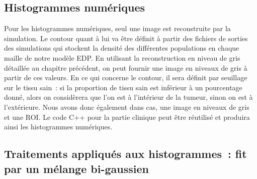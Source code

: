 \documentclass[main.tex]{subfiles}
\begin{document}
\subsection{Histogrammes numériques}
Pour les histogrammes numériques, seul une image est reconstruite par la simulation. Le contour quant à lui va être définit à partir des fichiers de sorties des simulations qui stockent la densité des différentes populations en chaque maille de notre modèle EDP. En utilisant la reconstruction en niveau de gris détaillée au chapitre précédent, on peut fournir une image en niveaux de gris à partir de ces valeurs. En ce qui concerne le contour, il sera définit par seuillage sur le tissu sain~: si la proportion de tissu sain est inférieur à un pourcentage donné, alors on considèrera que l'on est à l'intérieur de la tumeur, sinon on est à l'extérieure. Nous avons donc également dans cas, une image en niveaux de gris et une ROI. Le code C++ pour la partie clinique peut être réutilisé et produira ainsi les histogrammes numériques.

\subsection{Traitements appliqués aux histogrammes~: fit par un mélange bi-gaussien}
\end{document}
